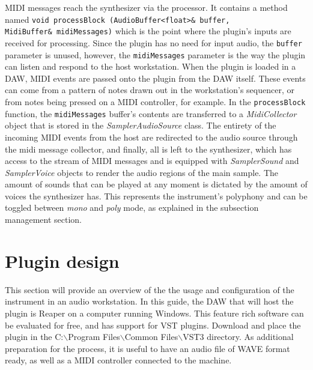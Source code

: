 \documentclass[12pt, a4paper, hidelinks]{article}
\begin{document}
	MIDI messages reach the synthesizer via the processor. It contains a method named \texttt{void processBlock (AudioBuffer<float>\& buffer, \\
	MidiBuffer\& midiMessages)} which is the point where the plugin's inputs are received for processing. Since the plugin has no need for input audio, the \texttt{buffer} parameter is unused, however, the \texttt{midiMessages} parameter is the way the plugin can listen and respond to the host workstation. When the plugin is loaded in a DAW, MIDI events are passed onto the plugin from the DAW itself. These events can come from a pattern of notes drawn out in the workstation's sequencer, or from notes being pressed on a MIDI controller, for example. In the \texttt{processBlock} function, the \texttt{midiMessages} buffer's contents are transferred to a \textit{MidiCollector} object that is stored in the \textit{SamplerAudioSource} class. The entirety of the incoming MIDI events from the host are redirected to the audio source through the midi message collector, and finally, all is left to the synthesizer, which has access to the stream of MIDI messages and is equipped with \textit{SamplerSound} and \textit{SamplerVoice} objects to render the audio regions of the main sample. The amount of sounds that can be played at any moment is dictated by the amount of voices the synthesizer has. This represents the instrument's polyphony and can be toggled between \textit{mono} and \textit{poly} mode, as explained in the subsection management section.
	\par
	
		
	\newpage	
	\section{Plugin design}
	This section will provide an overview of the the usage and configuration of the instrument in an audio workstation. In this guide, the DAW that will host the plugin is Reaper \cite{reaper} on a computer running Windows. This feature rich software can be evaluated for free, and has support for VST plugins. Download \cite{plugin} and place the plugin in the C:$\backslash$Program Files$\backslash$Common Files$\backslash$VST3 directory.
	As additional preparation for the process, it is useful to have an audio file of WAVE format ready, as well as a MIDI controller connected to the machine.\par
	
\end{document}
